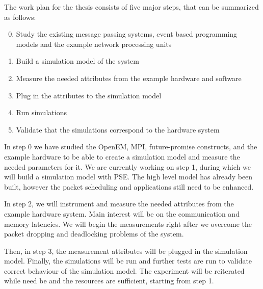 The work plan for the thesis consists of five major steps, that can be summarized as follows:

\begin{enumerate}
\setcounter{enumi}{-1}
\item Study the existing message passing systems, event based programming models and the example network processing units
\item Build a simulation model of the system
\item Measure the needed attributes from the example hardware and software
\item Plug in the attributes to the simulation model
\item Run simulations
\item Validate that the simulations correspond to the hardware system
\end{enumerate}

In step 0 we have studied the OpenEM, MPI, future-promise constructs, and the example hardware to be able to create a simulation model and measure the needed parameters for it. We are currently working on step 1, during which we will build a simulation model with PSE. The high level model has already been built, however the packet scheduling and applications still need to be enhanced.

In step 2, we will instrument and measure the needed attributes from the example hardware system. Main interest will be on the communication and memory latencies. We will begin the measurements right after we overcome the packet dropping and deadlocking problems of the system.

Then, in step 3, the measurement attributes will be plugged in the simulation model. Finally, the simulations will be run and further tests are run to validate correct behaviour of the simulation model. The experiment will be reiterated while need be and the resources are sufficient, starting from step 1.

